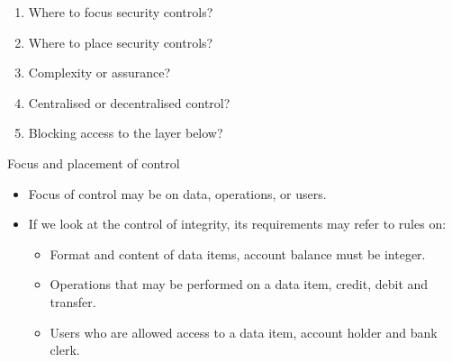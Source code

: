 \begin{frame}
  \begin{enumerate}
    \item Where to focus security controls?
    \item Where to place security controls?
    \item Complexity or assurance?
    \item Centralised or decentralised control?
    \item Blocking access to the layer below?
  \end{enumerate}
\end{frame}

\begin{frame}
  \begin{block}{Focus and placement of control}
    \begin{itemize}
      \item Focus of control may be on data, operations, or users.

      \item If we look at the control of integrity, its requirements may refer to 
        rules on:
        \begin{itemize}
          \item Format and content of data items, \eg account balance must be 
            integer.

          \item Operations that may be performed on a data item, \eg credit, debit 
            and transfer.

          \item Users who are allowed access to a data item, \eg account holder 
            and bank clerk.
        \end{itemize}
    \end{itemize}
  \end{block}
\end{frame}


